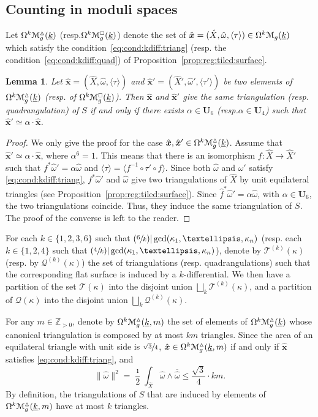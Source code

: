 \documentclass[11pt]{article}
\newcommand{\resp}{resp.\xspace}
\numberwithin{equation}{section}
\let\mathcal\EuScript
\newcommand{\Psfrac}[2]{(\sfrac{#1}{#2})}
\theoremstyle{plain}
\newtheorem{Lemma}[Theorem]{Lemma}
\theoremstyle{definition}
\newcommand\Z{\mathbb{Z}}
\newcommand{\Ub}{\mathbf{U}}
\newcommand{\Mcal}{\mathcal{M}}
\newcommand{\QQ}{\mathscr{Q}}
\newcommand{\TT}{\mathscr{T}}
\newcommand{\hX}{\hat{X}}
\newcommand{\homg}{\hat{\omega}}
\newcommand{\hf}{\hat{f}}
\newcommand{\hxx}{\hat{\boldsymbol{x}}}
\let\ol\overline
\let\ul\underline
\newcommand{\Skdiff}{\Omega^k\mathcal{M}_{g}(\ul{k})}
\newcommand{\Tkdiff}{\Omega^k\Mcal^\vartriangle_g(\ul{k})}
\newcommand{\Qkdiff}{\Omega^k\Mcal^{\scriptscriptstyle\square}_g(\ul{k})}
\newcommand{\Tkdiffm}{\Omega^k\Mcal^\vartriangle_g(\ul{k},m)}
\begin{document}
\subsection{Counting in moduli spaces}\label{sec:count:in:mod:sp}
Let $\Tkdiff$ (\resp $\Qkdiff$) denote the set of $\hxx=(\hX,\homg,\langle\tau\rangle)\in \Skdiff$ which satisfy the condition~\eqref{eq:cond:kdiff:triang} (\resp the condition~\eqref{eq:cond:kdiff:quad}) of Proposition~\ref{prop:reg:tiled:surface}.

\begin{Lemma}\label{lm:forms:same:triang}
Let $\hxx\!=\!(\hX,\homg,\langle \tau \rangle)$ and $\hxx{}'\!=\!(\hX',\homg',\langle \tau' \rangle)$ be two elements of $\Tkdiff$ (\resp of $\Qkdiff$).
Then $\hxx$ and $\hxx{}'$ give the same triangulation (\resp quadran\-gulation) of $S$ if and only if there exists $\alpha\in \Ub_6$ (\resp $\alpha\in \Ub_{4}$) such that $\hxx{}'\simeq\alpha\cdot\hxx$.
\end{Lemma}
\begin{proof}
We only give the proof for the case $\hxx,\hxx{}'\in\Tkdiff$.
Assume that $\hxx{}' \simeq\alpha\cdot\hxx$, where $\alpha^{6}=1$.
This means that there is an isomorphism $f: \hX \to \hX'$ such that $f^*\homg'=\alpha\homg$ and $\langle \tau\rangle=\langle f^{-1}\circ\tau'\circ f \rangle$. Since both $\homg$ and $\homg'$ satisfy \eqref{eq:cond:kdiff:triang}, $f^*\homg'$ and $\homg$ give two triangulations of $\hX$ by unit equilateral triangles (see Proposition~\ref{prop:reg:tiled:surface}). Since $\hf^*\homg'=\alpha\homg$, with $\alpha\in \Ub_6$, the two triangulations coincide. Thus, they induce the same triangulation of $S$. The proof of the converse is left to the reader.
\end{proof}

For each $k \in \{1,2,3,6\}$ such that $\Psfrac{6}{k} | \gcd(\kappa_1,\dots,\kappa_n)$ (\resp each $k\in \{1,2,4\}$ such that $\Psfrac{4}{k} | \gcd(\kappa_1,\dots,\kappa_n)$), denote by $\TT^{(k)}(\kappa)$ (\resp by $\QQ^{(k)}(\kappa)$) the set of triangulations (\resp quadrangulations) such that the corresponding flat surface is induced by a $k$-differential. We then have a partition of the set $\TT(\kappa)$ into the disjoint union $\bigsqcup_{k}\TT^{(k)}(\kappa)$, and a partition of $\QQ(\kappa)$ into the disjoint union $\bigsqcup_{k}\QQ^{(k)}(\kappa)$.

For any $m\in \Z_{>0}$, denote by $\Tkdiffm$ the set of elements of $\Tkdiff$ whose canonical triangulation is composed by at most $km$ triangles.
Since the area of an equilateral triangle with unit side is $\sfrac{\sqrt{3}}{4}$, $\hxx \in \Tkdiffm$ if and only if $\hxx$ satisfies \eqref{eq:cond:kdiff:triang}, and
\[
\|\homg\|^2=\frac{\imath}{2}\int_{\hX}\homg\wedge\ol{\homg} \leq \frac{\sqrt{3}}{4}\cdot km.
\]
By definition, the triangulations of $S$ that are induced by elements of $\Tkdiffm$ have at most $k$ triangles.
\end{document}
